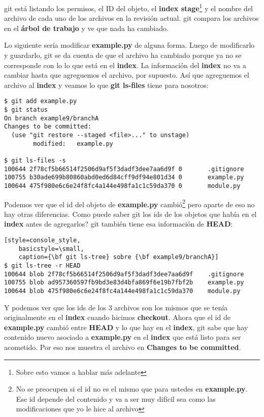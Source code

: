 git está listando los permisos, el ID del objeto, el {\bf index stage}\footnote{Sobre esto vamos a hablar más adelante} y el nombre
del archivo de cada uno de los archivos en la revisión actual. git compara los archivos en el {\bf árbol de trabajo} y ve que
nada ha cambiado.

Lo siguiente sería modificar {\bf example.py} de alguna forma. Luego de modificarlo y guardarlo, git se da cuenta de que
el archivo ha cambiado porque ya no se corresponde con lo lo que está en el {\bf index}. La información del {\bf index}
no va a cambiar hasta que agreguemos el archivo, por supuesto. Así que agreguemos el archivo al {\bf index} y veamos lo que
{\bf git ls-files} tiene para nosotros:

\begin{lstlisting}[style=console_style,
	basicstyle=\small,
	caption={\bf git ls-files} con un archivo modificado]
$ git add example.py
$ git status
On branch example9/branchA
Changes to be committed:
  (use "git restore --staged <file>..." to unstage)
        modified:   example.py

$ git ls-files -s
100644 2f78cf5b66514f2506d9af5f3dadf3dee7aa6d9f 0       .gitignore
100755 b30ade699b80860abd0ed6d84cff9df94e801d34 0       example.py
100644 475f980e6c6e24f8fc4a144e498fa1c1c59da370 0       module.py
\end{lstlisting}

Podemos ver que el id del objeto de {\bf example.py} cambió\footnote{No se preocupen si el id no es el mismo que para ustedes en {\bf example.py}.
Ese id depende del contenido y va a ser muy difícil sea como las modificaciones que yo le hice al archivo} pero aparte de eso no hay otras
diferencias. Como puede saber git los ids de los objetos que había en el {\bf index} antes de agregarlos? git también tiene esa información
de {\bf HEAD}:

\begin{lstlisting}[style=console_style,
	basicstyle=\small,
	caption={\bf git ls-tree} sobre {\bf example9/branchA}]
$ git ls-tree -r HEAD
100644 blob 2f78cf5b66514f2506d9af5f3dadf3dee7aa6d9f    .gitignore
100755 blob ad957360597fb9bd3e83d4bfa869f6e19b7fbf2b    example.py
100644 blob 475f980e6c6e24f8fc4a144e498fa1c1c59da370    module.py
\end{lstlisting}

Y podemos ver que los ids de los 3 archivos son los mismos que se tenía originalmente en el {\bf index} cuando hicimos {\bf checkout}.
Ahora que el id de {\bf example.py} cambió entre {\bf HEAD} y lo que hay en el {\bf index}, git sabe que hay contenido nuevo asociado
a {\bf example.py} en el {\bf index} que está listo para ser acometido. Por eso nos muestra el archivo en {\bf Changes to be committed}.

